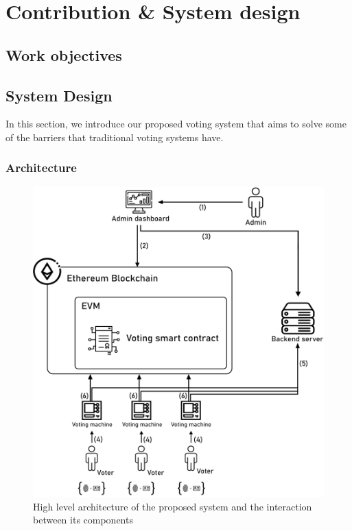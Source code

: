 \chapter{Contribution \& System design}
\section{Work objectives}
\section{System Design}

In this section, we introduce our proposed voting system that aims to solve some of the barriers that traditional voting systems have.

\subsection{Architecture}

\begin{figure}[H]
	\centering
		\includegraphics[width=12cm]{images/chapter3/architecture.png}
		\caption{{\footnotesize High level architecture of the proposed system and the interaction between its components}}
\end{figure}

